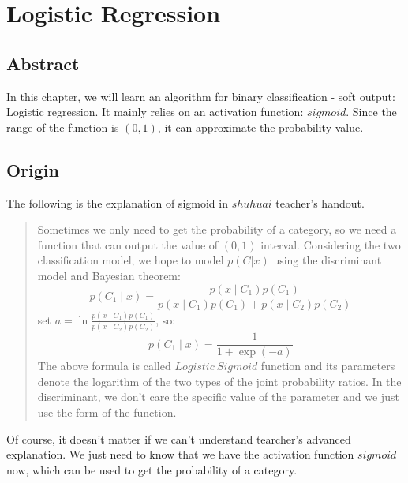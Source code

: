 \documentclass{report}
\begin{document}
\chapter{Logistic Regression}
\section{Abstract}
In this chapter, we will learn an algorithm for binary classification - soft output: Logistic regression. It mainly relies on an activation function: $sigmoid$. Since the range of the function is $(0,1)$, it can approximate the probability value.
\section{Origin}
The following is the explanation of sigmoid in $shuhuai$ teacher's handout.
\begin{quotation}
	Sometimes we only need to get the probability of a category, so we need a function that can output the value of $(0, 1)$ interval. Considering the two classification model, we hope to model $p(C|x)$ using the discriminant model and Bayesian theorem: $$p\left(C_{1} \mid x\right)=\frac{p\left(x \mid C_{1}\right) p\left(C_{1}\right)}{p\left(x \mid C_{1}\right) p\left(C_{1}\right)+p\left(x \mid C_{2}\right) p\left(C_{2}\right)}$$
	set $a=\ln \frac{p\left(x \mid C_{1}\right) p\left(C_{1}\right)}{p\left(x \mid C_{2}\right) p\left(C_{2}\right)}$, so:
$$
p\left(C_{1} \mid x\right)=\frac{1}{1+\exp (-a)}
$$
The above formula is called $Logistic\ Sigmoid$ function and its parameters denote the logarithm of the two types of the joint probability ratios. In the discriminant, we don't care the specific value of the parameter and we just use the form of the function.
\end{quotation}
Of course, it doesn't matter if we can't understand tearcher's advanced explanation. We just need to know that we have the activation function $sigmoid$ now, which can be used to get the probability of a category.
\end{document}
